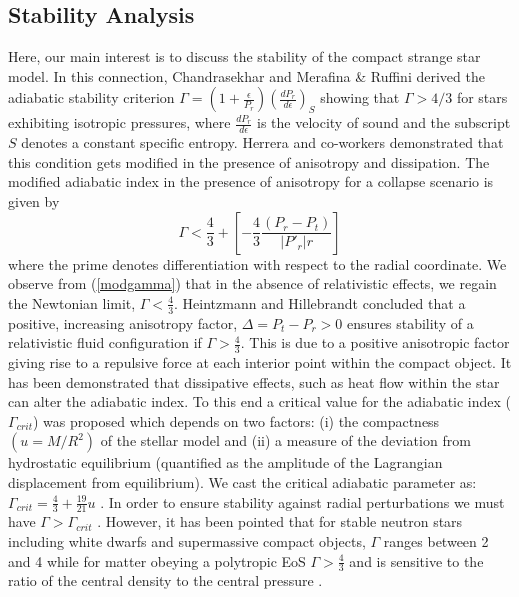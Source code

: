 \documentclass[]{aastex631}
\begin{document}
\subsection{Stability Analysis} \label{sec5.2}
Here, our main interest is to discuss the stability of the compact strange star model. In this connection, Chandrasekhar \citep{chandra1,chandra2}  and Merafina \& Ruffini \citep{Merafina} derived the adiabatic stability criterion $\Gamma = \left(1+\frac{\epsilon}{P_r}\right) \left(\frac{dP_r}{d\epsilon}\right)_S$ showing that $\Gamma > 4/3$ for stars exhibiting isotropic pressures, where $\frac{dP_r}{d\epsilon}$ is the velocity of sound
and the subscript $S$ denotes a constant specific entropy. Herrera and co-workers demonstrated that this condition gets modified in the presence of anisotropy and dissipation.  The modified adiabatic index in the presence of anisotropy for a collapse scenario is given by 
\begin{equation} \label{modgamma}
\Gamma < \frac{4}{3} + \left[-\frac{4}{3}\frac{(P_r - P_t)}{|P'_r|r}\right]
\end{equation}
where the prime denotes differentiation with respect to the radial coordinate. We observe from (\ref{modgamma}) that in the absence of relativistic effects, we regain the Newtonian limit, $\Gamma < \frac{4}{3}$. Heintzmann and Hillebrandt \citep{hill} concluded that a positive, increasing anisotropy factor, $\Delta = P_t - P_r > 0$ ensures stability of a relativistic fluid configuration if $\Gamma > \frac{4}{3}$. This is due to a positive anisotropic factor giving rise to a repulsive force at each interior point within the compact object. It has been demonstrated that dissipative effects, such as heat flow within the star can alter the adiabatic index. To this end a critical value for the adiabatic index ($\Gamma_{crit}$) was proposed which depends on two factors: (i) the compactness $(u = M/R^2)$ of the stellar model and (ii) a measure of the deviation from hydrostatic equilibrium (quantified as the amplitude of the Lagrangian displacement from equilibrium).  We cast the critical adiabatic parameter as: $\Gamma_{crit} = \frac{4}{3} + \frac{19}{21}u$ \citep{mou,maurcrit}.  In order to ensure stability against radial perturbations we must have $\Gamma > \Gamma_{crit}$ \citep{mou}. However, it has been pointed that for stable neutron stars including white dwarfs and supermassive compact objects, $\Gamma$ ranges between 2 and 4 while for matter obeying a polytropic EoS $\Gamma > \frac{4}{3}$ and is sensitive to the ratio of the central density to the central pressure \citep{ayan3}. 
\end{document}
